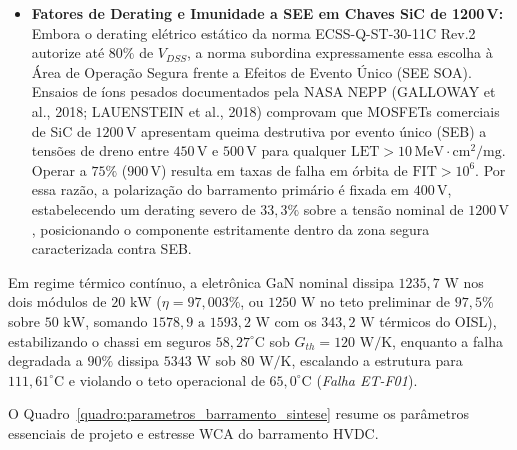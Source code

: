 \begin{itemize}[leftmargin=*]
    \item \textbf{Fatores de Derating e Imunidade a SEE em Chaves SiC de 1200\,V:} Embora o derating elétrico estático da norma ECSS-Q-ST-30-11C Rev.2 autorize até $80\%$ de $V_{DSS}$, a norma subordina expressamente essa escolha à Área de Operação Segura frente a Efeitos de Evento Único (SEE SOA). Ensaios de íons pesados documentados pela NASA NEPP (GALLOWAY et al., 2018; LAUENSTEIN et al., 2018) comprovam que MOSFETs comerciais de SiC de $1200\,\mathrm{V}$ apresentam queima destrutiva por evento único (SEB) a tensões de dreno entre $450\,\mathrm{V}$ e $500\,\mathrm{V}$ para qualquer $\mathrm{LET} > 10\,\mathrm{MeV}\cdot\mathrm{cm^2/mg}$. Operar a $75\%$ ($900\,\mathrm{V}$) resulta em taxas de falha em órbita de $\mathrm{FIT} > 10^6$. Por essa razão, a polarização do barramento primário é fixada em $400\,\mathrm{V}$, estabelecendo um derating severo de $33{,}3\%$ sobre a tensão nominal de $1200\,\mathrm{V}$, posicionando o componente estritamente dentro da zona segura caracterizada contra SEB.
\end{itemize}

Em regime térmico contínuo, a eletrônica GaN nominal dissipa $1235{,}7\text{ W}$ nos dois módulos de $20\text{ kW}$ ($\eta = 97{,}003\%$, ou $1250\text{ W}$ no teto preliminar de $97{,}5\%$ sobre $50\text{ kW}$, somando $1578{,}9\text{ a }1593{,}2\text{ W}$ com os $343{,}2\text{ W}$ térmicos do OISL), estabilizando o chassi em seguros $58{,}27^\circ\text{C}$ sob $G_{th} = 120\text{ W/K}$, enquanto a falha degradada a $90\%$ dissipa $5343\text{ W}$ sob $80\text{ W/K}$, escalando a estrutura para $111{,}61^\circ\text{C}$ e violando o teto operacional de $65{,}0^\circ\text{C}$ (\textit{Falha ET-F01}).

O Quadro~\ref{quadro:parametros_barramento_sintese} resume os parâmetros essenciais de projeto e estresse WCA do barramento HVDC.

